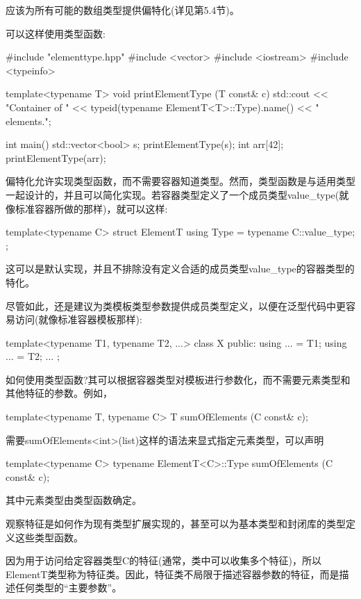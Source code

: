 应该为所有可能的数组类型提供偏特化(详见第5.4节)。

可以这样使用类型函数:

\begin{cpp}
#include "elementtype.hpp"
#include <vector>
#include <iostream>
#include <typeinfo>

template<typename T>
void printElementType (T const& c)
{
	std::cout << "Container of "
	<< typeid(typename ElementT<T>::Type).name()
	<< " elements.\n";
}

int main()
{
	std::vector<bool> s;
	printElementType(s);
	int arr[42];
	printElementType(arr);
}
\end{cpp}

偏特化允许实现类型函数，而不需要容器知道类型。然而，类型函数是与适用类型一起设计的，并且可以简化实现。若容器类型定义了一个成员类型value\_type(就像标准容器所做的那样)，就可以这样:

\begin{cpp}
template<typename C>
struct ElementT {
	using Type = typename C::value_type;
};
\end{cpp}

这可以是默认实现，并且不排除没有定义合适的成员类型value\_type的容器类型的特化。

尽管如此，还是建议为类模板类型参数提供成员类型定义，以便在泛型代码中更容易访问(就像标准容器模板那样):

\begin{cpp}
template<typename T1, typename T2, ...>
class X {
	public:
	using ... = T1;
	using ... = T2;
	...
};
\end{cpp}

如何使用类型函数?其可以根据容器类型对模板进行参数化，而不需要元素类型和其他特征的参数。例如，

\begin{cpp}
template<typename T, typename C>
T sumOfElements (C const& c);
\end{cpp}

需要sumOfElements<int>(list)这样的语法来显式指定元素类型，可以声明

\begin{cpp}
template<typename C>
typename ElementT<C>::Type sumOfElements (C const& c);
\end{cpp}

其中元素类型由类型函数确定。

观察特征是如何作为现有类型扩展实现的，甚至可以为基本类型和封闭库的类型定义这些类型函数。

因为用于访问给定容器类型C的特征(通常，类中可以收集多个特征)，所以ElementT类型称为特征类。因此，特征类不局限于描述容器参数的特征，而是描述任何类型的“主要参数”。


